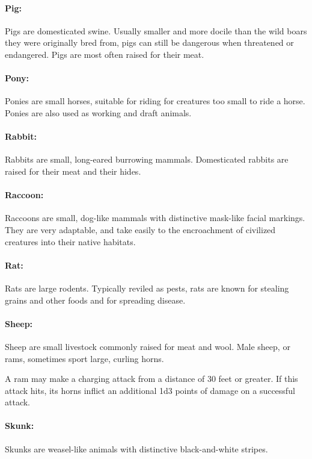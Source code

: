 \begin{multicols}{2}
\paragraph{Pig:} Pigs are domesticated swine. Usually smaller and more docile than the wild boars they were originally bred from, pigs can still be dangerous when threatened or endangered. Pigs are most often raised for their meat.

\paragraph{Pony:} Ponies are small horses, suitable for riding for creatures too small to ride a horse. Ponies are also used as working and draft animals.

\paragraph{Rabbit:} Rabbits are small, long-eared burrowing mammals. Domesticated rabbits are raised for their meat and their hides.

\paragraph{Raccoon:} Raccoons are small, dog-like mammals with distinctive mask-like facial markings. They are very adaptable, and take easily to the encroachment of civilized creatures into their native habitats.

\paragraph{Rat:} Rats are large rodents. Typically reviled as pests, rats are known for stealing grains and other foods and for spreading disease.

\paragraph{Sheep:} Sheep are small livestock commonly raised for meat and wool. Male sheep, or rams, sometimes sport large, curling horns.

A ram may make a charging attack from a distance of 30 feet or greater. If this attack hits, its horns inflict an additional 1d3 points of damage on a successful attack.

\paragraph{Skunk:} Skunks are weasel-like animals with distinctive black-and-white stripes.


\end{multicols}
